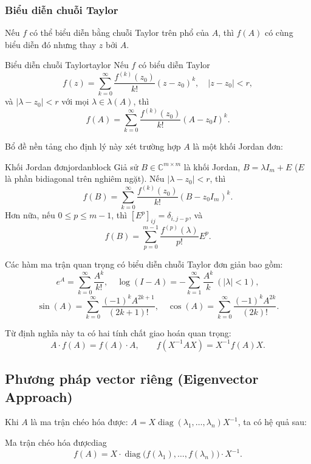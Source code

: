 \documentclass[12pt,a4paper]{report}
\newcommand{\C}{\mathbb{C}}
\newcommand{\diag}{\operatorname{diag}}
\begin{document}
\subsubsection{Biểu diễn chuỗi Taylor}

Nếu $f$ có thể biểu diễn bằng chuỗi Taylor trên phổ của $A$, thì $f(A)$ có cùng
biểu diễn đó nhưng thay $z$ bởi $A$.

\begin{theorem}{Biểu diễn chuỗi Taylor}{taylor}
Nếu $f$ có biểu diễn Taylor
\[
  f(z) = \sum_{k=0}^{\infty} \frac{f^{(k)}(z_0)}{k!}(z - z_0)^k, \quad |z - z_0| < r,
\]
và $|\lambda - z_0| < r$ với mọi $\lambda \in \lambda(A)$, thì
\[
  f(A) = \sum_{k=0}^{\infty} \frac{f^{(k)}(z_0)}{k!}(A - z_0 I)^k.
\]
\end{theorem}

Bổ đề nền tảng cho định lý này xét trường hợp $A$ là một khối Jordan đơn:

\begin{lemma}{Khối Jordan đơn}{jordanblock}
Giả sử $B \in \C^{m \times m}$ là khối Jordan, $B = \lambda I_m + E$ ($E$ là phần
bidiagonal trên nghiêm ngặt). Nếu $|\lambda - z_0| < r$, thì
\[
  f(B) = \sum_{k=0}^{\infty} \frac{f^{(k)}(z_0)}{k!}(B - z_0 I_m)^k.
\]
Hơn nữa, nếu $0 \le p \le m-1$, thì $[E^p]_{ij} = \delta_{i,j-p}$, và
\[
  f(B) = \sum_{p=0}^{m-1} \frac{f^{(p)}(\lambda)}{p!} E^p.
\]
\end{lemma}

Các hàm ma trận quan trọng có biểu diễn chuỗi Taylor đơn giản bao gồm:
\[
  e^A = \sum_{k=0}^{\infty} \frac{A^k}{k!}, \quad
  \log(I-A) = -\sum_{k=1}^{\infty} \frac{A^k}{k}\ (|\lambda| < 1),
\]
\[
  \sin(A) = \sum_{k=0}^{\infty} \frac{(-1)^k A^{2k+1}}{(2k+1)!}, \quad
  \cos(A) = \sum_{k=0}^{\infty} \frac{(-1)^k A^{2k}}{(2k)!}.
\]

Từ định nghĩa này ta có hai tính chất giao hoán quan trọng:
\[
  A \cdot f(A) = f(A) \cdot A, \qquad
  f(X^{-1}AX) = X^{-1} f(A) X.
\]

\subsection{Phương pháp vector riêng (Eigenvector Approach)}

Khi $A$ là ma trận chéo hóa được: $A = X \diag(\lambda_1, \ldots, \lambda_n) X^{-1}$,
ta có hệ quả sau:

\begin{corollary}{Ma trận chéo hóa được}{diag}
\[
  f(A) = X \cdot \diag\bigl(f(\lambda_1), \ldots, f(\lambda_n)\bigr) \cdot X^{-1}.
\]
\end{corollary}
\end{document}
